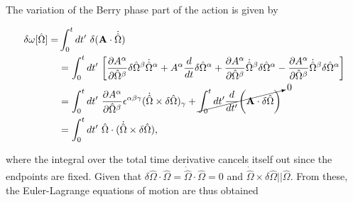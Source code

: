 \documentclass{homework}
\begin{document}
The variation of the Berry phase part of the action is given by 

\begin{equation}
    \begin{split}
        \delta\omega[\hat{\Omega}] =& \int_0^t dt' \textnormal{ } \delta({\bf A} \cdot \dot{\hat{\Omega}}) \\
        &= \int_{0}^{t} dt' \textnormal{ } \bigg[\frac{\partial A^\alpha}{\partial \hat{\Omega}^\beta} \delta\hat{\Omega}^\beta \dot{\hat{\Omega}}^\alpha + A^\alpha \frac{d}{dt} \delta \hat{\Omega}^\alpha + \frac{\partial A^\alpha}{\partial \hat{\Omega}^\beta} \dot{\hat{\Omega}}^\beta \delta \hat{\Omega}^\alpha - \frac{\partial A^{\alpha}}{\partial \hat{\Omega}^\beta} \dot{\hat{\Omega}}^\beta \delta \hat{\Omega}^\alpha\bigg] \\
        &= \int_{0}^{t} dt' \textnormal{ } \frac{\partial A^{\alpha}}{\partial \hat{\Omega}^\beta} \epsilon^{\alpha \beta \gamma} (\dot{\hat{\Omega}} \times \delta \hat{\Omega})_{\gamma} + \cancelto{0}{\int_{0}^{t} dt' \frac{d}{dt'} \bigg({\bf A} \cdot \delta\hat{\Omega}\bigg)} \\
        &= \int_{0}^{t} dt' \textnormal{ } {\hat{\Omega}} \cdot (\dot{\hat{\Omega}} \times \delta \hat{\Omega}),
        \label{Berry_phase_semiclassical_variation}
    \end{split}
\end{equation}

where the integral over the total time derivative cancels itself out since the endpoints are fixed. Given that $\delta{\hat{\Omega}} \cdot \hat{\Omega} = \dot{\hat{\Omega}} \cdot \hat{\Omega} = 0$ and $\dot{\hat{\Omega}} \times \delta \hat{\Omega} || \hat{\Omega}$. From these, the Euler-Lagrange equations of motion are thus obtained 
\end{document}
